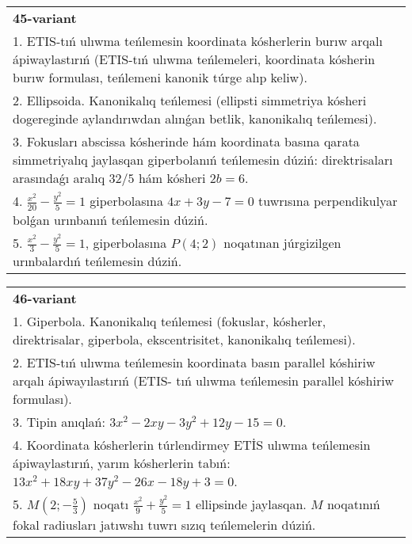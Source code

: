 \documentclass{article}
\begin{document}
\begin{tabular}{m{17cm}}
\textbf{45-variant}\\
1. ETIS-tıń ulıwma teńlemesin koordinata kósherlerin burıw arqalı ápiwaylastırıń (ETIS-tıń ulıwma teńlemeleri, koordinata kósherin burıw formulası, teńlemeni kanonik túrge alıp keliw).\\

2. Ellipsoida. Kanonikalıq teńlemesi (ellipsti simmetriya kósheri dogereginde aylandırıwdan alınǵan betlik, kanonikalıq teńlemesi).\\

3. Fokusları abscissa kósherinde hám koordinata basına qarata simmetriyalıq jaylasqan giperbolanıń teńlemesin dúziń: direktrisaları arasındaǵı aralıq $32/5$ hám kósheri $2 b=6$.\\

4. $\frac{x^{2}}{20} - \frac{y^{2}}{5} = 1$ giperbolasına $4x + 3y - 7 = 0$ tuwrısına perpendikulyar bolǵan urınbanıń teńlemesin dúziń.  \\

5. $\frac{x^{2}}{3} - \frac{y^{2}}{5} = 1$, giperbolasına $P(4;2)$ noqatınan júrgizilgen urınbalardıń teńlemesin dúziń.  
\end{tabular}
\vspace{1cm}


\begin{tabular}{m{17cm}}
\textbf{46-variant}\\
1. Giperbola. Kanonikalıq teńlemesi (fokuslar, kósherler, direktrisalar, giperbola, ekscentrisitet, kanonikalıq teńlemesi).\\

2. ETIS-tıń ulıwma teńlemesin koordinata basın parallel kóshiriw arqalı ápiwayılastırıń (ETIS- tıń ulıwma teńlemesin parallel kóshiriw formulası).\\

3. Tipin anıqlań: $3 x^{2}-2 xy-3 y^{2}+12 y-15=0$.\\

4. Koordinata kósherlerin túrlendirmey ETİS ulıwma teńlemesin ápiwaylastırıń, yarım kósherlerin tabıń: $13x^{2} + 18xy + 37y^{2} - 26x - 18y + 3 = 0$.  \\

5. $M(2; - \frac{5}{3})$ noqatı $\frac{x^{2}}{9} + \frac{y^{2}}{5} = 1$ ellipsinde jaylasqan. $M$ noqatınıń fokal radiusları jatıwshı tuwrı sızıq teńlemelerin dúziń.  
\end{tabular}
\vspace{1cm}
\end{document}
